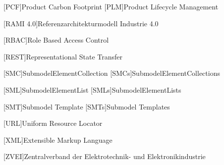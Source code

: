 {\begin{acronym}
[PCF]{Product Carbon Footprint}
[PLM]{Product Lifecycle Management}

[RAMI 4.0]{Referenzarchitekturmodell Industrie 4.0}

[RBAC]{Role Based Access Control}

[REST]{Representational State Transfer}

[SMC]{SubmodelElementCollection}
[SMCs]{SubmodelElementCollections}

[SML]{SubmodelElementList}
[SMLs]{SubmodelElementLists}

[SMT]{Submodel Template}
[SMTs]{Submodel Templates}

[URL]{Uniform Resource Locator}

[XML]{Extensible Markup Language}

[ZVEI]{Zentralverband der Elektrotechnik- und Elektronikindustrie}
\end{acronym}
}

\newpage